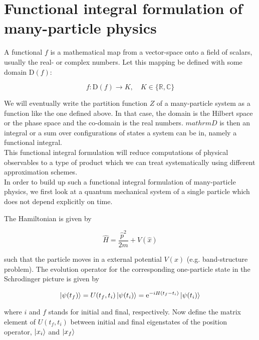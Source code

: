 \section{Functional integral formulation of many-particle physics}

A functional $f$ is a mathematical map from a vector-space onto a field of scalars, usually the real- or complex numbers. Let this mapping be defined with some domain $\mathrm{D}(f)$: 

\begin{equation*}
    f: \mathrm{D}(f) \to K, \quad K \in \{\mathbb{R}, \mathbb{C} \}
\end{equation*}

We will eventually write the partition function $Z$ of a many-particle system as a function like the one defined above. In that case, the domain is the Hilbert space or the phase space and the co-domain is the real numbers. $mathrm{D}$ is then an integral or a sum over configurations of states a system can be in, namely a functional integral. \\

This functional integral formulation will reduce computations of physical observables to a type of product which we can treat systematically using different approximation schemes. \\ 

In order to build up such a functional integral formulation of many-particle physics, we first look at a quantum mechanical system of a single particle which does not depend explicitly on time. 

The Hamiltonian is given by 

\begin{equation*}
    \hat{H} = \frac{\hat{p}^{2}}{2m} + V(\hat{x})
\end{equation*}

such that the particle moves in a external potential $V(x)$ (e.g. band-structure problem). The evolution operator for the corresponding one-particle state in the Schrodinger picture is given by 

\begin{equation*}
    \ket{\psi(t_{f})} = U(t_{f}, t_{i})\ket{\psi(t_{i})} = \mathrm{e}^{-iH(t_{f} - t_{i})}\ket{\psi(t_{i})}
\end{equation*}

where $i$ and $f$ stands for initial and final, respectively. Now define the matrix element of $U(t_{f},t_{i})$ between initial and final eigenstates of the position operator, $\ket{x_{i}}$ and $\ket{x_{f}}$ \\ 

